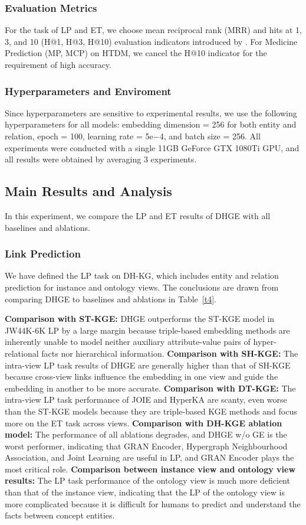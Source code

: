 \documentclass[letterpaper]{article} \usepackage{aaai23}  \usepackage{times}  \usepackage{helvet}  \usepackage{courier}  \usepackage[hyphens]{url}  \usepackage{graphicx} \urlstyle{rm} \def\UrlFont{\rm}  \usepackage{natbib}  \usepackage{caption} \frenchspacing  \setlength{\pdfpagewidth}{8.5in}  \setlength{\pdfpageheight}{11in}  \usepackage{times}
\begin{document}
\subsubsection{Evaluation Metrics}
For the task of LP and ET, we choose mean reciprocal rank (MRR) and hits at 1, 3, and 10 (H@1, H@3, H@10) evaluation indicators introduced by \citet{TransE}. For Medicine Prediction (MP, MCP) on HTDM, we cancel the H@10 indicator for the requirement of high accuracy.

\subsubsection{Hyperparameters and Enviroment}
Since hyperparameters are sensitive to experimental results, we use the following hyperparameters for all models: embedding dimension = 256 for both entity and relation, epoch = 100, learning rate = 5e$-$4, and batch size = 256. All experiments were conducted with a single 11GB GeForce GTX 1080Ti GPU, and all results were obtained by averaging 3 experiments.

\subsection{Main Results and Analysis}
\label{6.2}
In this experiment, we compare the LP and ET results of DHGE with all baselines and ablations. 

\subsubsection{Link Prediction}
We have defined the LP task on DH-KG, which includes entity and relation prediction for instance and ontology views. The conclusions are drawn from comparing DHGE to baselines and ablations in Table~\ref{t4}.

\textbf{Comparison with ST-KGE:} DHGE outperforms the  ST-KGE model in JW44K-6K LP by a large margin because triple-based embedding methods are inherently unable to model neither auxiliary attribute-value pairs of hyper-relational facts nor hierarchical information.
\textbf{Comparison with SH-KGE:} The intra-view LP task results of DHGE are generally higher than that of SH-KGE because cross-view links influence the embedding in one view and guide the embedding in another to be more accurate.
\textbf{Comparison with DT-KGE:} The intra-view LP task performance of JOIE and HyperKA are scanty, even worse than the ST-KGE models because they are triple-based KGE methods and focus more on the ET task across views.
\textbf{Comparison with DH-KGE ablation model:} The performance of all ablations degrades, and DHGE w/o GE is the worst performer, indicating that GRAN Encoder, Hypergraph Neighbourhood Association, and Joint Learning are useful in LP, and GRAN Encoder plays the most critical role.
\textbf{Comparison between instance view and ontology view results:} The LP task performance of the ontology view is much more deficient than that of the instance view, indicating that the LP of the ontology view is more complicated because it is difficult for humans to predict and understand the facts between concept entities.
\end{document}
